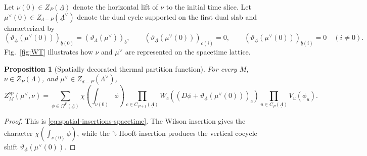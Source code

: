 \documentclass[dvipsnames,a4paper]{article}
\numberwithin{equation}{section}
\newtheorem{prop}[theorem]{Proposition}
\theoremstyle{definition}
\theoremstyle{remark}
\begin{document}
Let \(\nu(0)\in Z_P(\underline\Lambda)\) denote the horizontal lift of \(\nu\) to the
initial time slice. Let \(\mu^\vee(0)\in Z_{d-P}(\underline\Lambda^\vee)\) denote the dual
cycle supported on the first dual slab and characterized by
\begin{equation}
	\left(\vartheta_{\underline\Lambda}(\mu^\vee(0))\right)_{\underline b(0)}
	=
	(\vartheta_\Lambda(\mu^\vee))_b,
	\qquad
	\left(\vartheta_{\underline\Lambda}(\mu^\vee(0))\right)_{c(i)}=0,
	\qquad
	\left(\vartheta_{\underline\Lambda}(\mu^\vee(0))\right)_{\underline b(i)}=0
	\quad(i\neq0).
	\label{eq:eta-mu0}
\end{equation}
Fig.~\ref{fig:WT} illustrates how $\nu$ and $\mu^\vee$ are represented on the spacetime lattice.

\begin{prop}[Spatially decorated thermal partition function]
	\label{prop:spatially-decorated-spacetime}
	For every \(M\), \(\nu\in Z_P(\Lambda)\), and
	\(\mu^\vee\in Z_{d-P}(\Lambda^\vee)\),
	\begin{equation}
		Z_M^{\mathrm{sp}}(\mu^\vee,\nu)
		=
		\sum_{\phi\in\Omega^P(\underline\Lambda)}
		\chi\left(\int_{\nu(0)}\phi\right)
		\prod_{c\in C_{P+1}(\underline\Lambda)}
		W_c\left((D\phi+\vartheta_{\underline\Lambda}(\mu^\vee(0)))_c\right)
		\prod_{u\in C_P(\underline\Lambda)}
		V_u(\phi_u).
		\label{eq:Zsp}
	\end{equation}
\end{prop}

\begin{proof}
	This is \eqref{eq:spatial-insertions-spacetime}. The Wilson insertion gives the character
	\(\chi(\int_{\nu(0)}\phi)\), while the 't Hooft insertion produces the vertical
	cocycle shift \(\vartheta_{\underline\Lambda}(\mu^\vee(0))\).
\end{proof}
\end{document}

